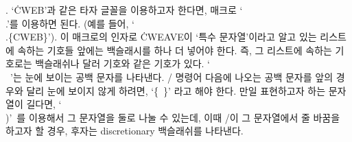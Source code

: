 {%
. `\.{CWEB}'과 같은 타자 글꼴을 이용하고자 한다면, 
매크로 `\.{\\.}'를 이용하면 된다. (예를 들어, `\.{\\.\{CWEB\}}'). 
이 매크로의 인자로 \.{CWEAVE}이 `특수 문자열'이라고 알고 있는 리스트에
속하는 기호들 앞에는 백슬래시를 하나 더 넣어야 한다. 즉, 그 리스트에
속하는 기호로는 백슬래쉬나 달러 기호와 같은 기호가 있다. 
`\.{\\\ }'는 눈에 보이는
공백 문자를 나타낸다. \TEX/ 명령어 다음에 나오는 공백 문자를 앞의
경우와 달리 눈에 보이지 않게 하려면, `\.{\{\ \}}' 라고 해야 한다.
만일 표현하고자 하는 문자열이 길다면, `\.{\\)}'\, 를 이용해서 그 문자열을
둘로 나눌 수 있는데, 이때 \TEX/이 그 문자열에서 줄 바꿈을 하고자 할 경우,
후자는 discretionary 백슬래쉬를 나타낸다.

}
